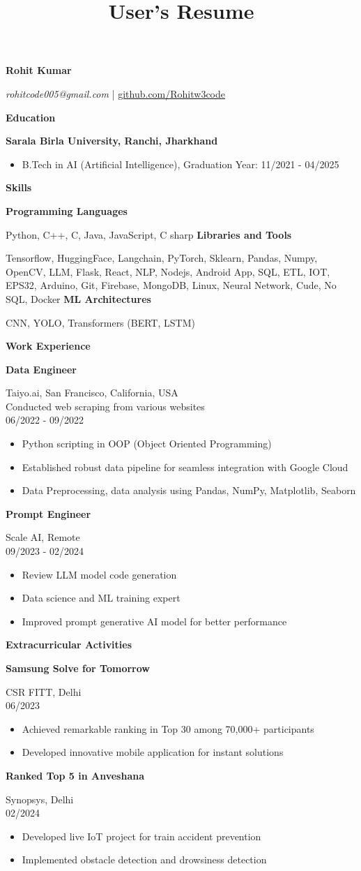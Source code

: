 \documentclass{article}
\newcommand{\mysection}[1]{\noindent\textbf{\large #1}\par}
\newcommand{\mysubsection}[1]{\noindent\textbf{#1}\par}
\newcommand{\myitem}[1]{\item \textcolor{linkblue}{#1}}
\begin{document}
\title{User's Resume}
\author{}
\date{}
\maketitle

\mysection{Rohit Kumar}
\textit{rohitcode005@gmail.com} | \href{github.com/Rohitw3code}{github.com/Rohitw3code}

\mysection{Education}
\mysubsection{Sarala Birla University, Ranchi, Jharkhand}
\begin{itemize}
    \myitem{B.Tech in AI (Artificial Intelligence), Graduation Year: 11/2021 - 04/2025}
\end{itemize}

\mysection{Skills}
\mysubsection{Programming Languages}
Python, C++, C, Java, JavaScript, C sharp
\mysubsection{Libraries and Tools}
Tensorflow, HuggingFace, Langchain, PyTorch, Sklearn, Pandas, Numpy, OpenCV, LLM, Flask, React, NLP, Nodejs, Android App, SQL, ETL, IOT, EPS32, Arduino, Git, Firebase, MongoDB, Linux, Neural Network, Cude, No SQL, Docker
\mysubsection{ML Architectures}
CNN, YOLO, Transformers (BERT, LSTM)

\mysection{Work Experience}
\mysubsection{Data Engineer}
Taiyo.ai, San Francisco, California, USA \\
Conducted web scraping from various websites \\
06/2022 - 09/2022
\begin{itemize}
    \myitem{Python scripting in OOP (Object Oriented Programming)}
    \myitem{Established robust data pipeline for seamless integration with Google Cloud}
    \myitem{Data Preprocessing, data analysis using Pandas, NumPy, Matplotlib, Seaborn}
\end{itemize}

\mysubsection{Prompt Engineer}
Scale AI, Remote \\
09/2023 - 02/2024
\begin{itemize}
    \myitem{Review LLM model code generation}
    \myitem{Data science and ML training expert}
    \myitem{Improved prompt generative AI model for better performance}
\end{itemize}

\mysection{Extracurricular Activities}
\mysubsection{Samsung Solve for Tomorrow}
CSR FITT, Delhi \\
06/2023
\begin{itemize}
    \myitem{Achieved remarkable ranking in Top 30 among 70,000+ participants}
    \myitem{Developed innovative mobile application for instant solutions}
\end{itemize}

\mysubsection{Ranked Top 5 in Anveshana}
Synopsys, Delhi \\
02/2024
\begin{itemize}
    \myitem{Developed live IoT project for train accident prevention}
    \myitem{Implemented obstacle detection and drowsiness detection}
\end{itemize}
\end{document}
